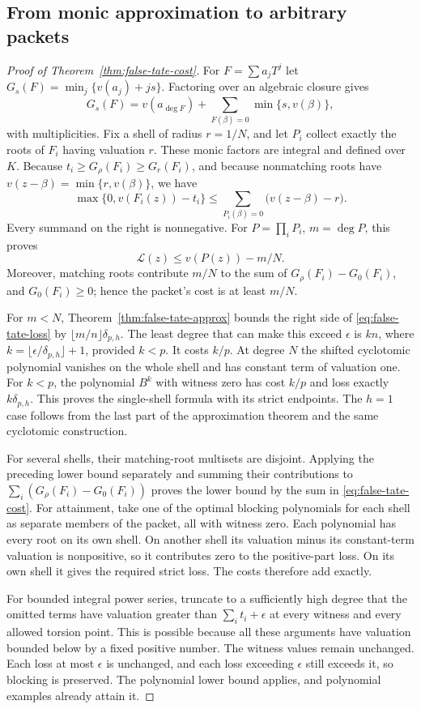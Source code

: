 \subsection{From monic approximation to arbitrary packets}
\begin{proof}[Proof of Theorem~\ref{thm:false-tate-cost}]
For $F=\sum a_jT^j$ let
$G_s(F)=\min_j\{v(a_j)+js\}$. Factoring over an algebraic closure gives
\[
 G_s(F)=v(a_{\deg F})+\sum_{F(\beta)=0}\min\{s,v(\beta)\},
\]
with multiplicities. Fix a shell of radius $r=1/N$, and let $P_i$
collect exactly the roots of $F_i$ having valuation $r$.
These monic factors are integral and defined over $K$.
Because $t_i\ge G_\rho(F_i)\ge G_r(F_i)$, and because nonmatching roots
have $v(z-\beta)=\min\{r,v(\beta)\}$, we have
\[
 \max\{0,v(F_i(z))-t_i\}
 \le\sum_{P_i(\beta)=0}\bigl(v(z-\beta)-r\bigr).
\]
Every summand on the right is nonnegative. For $P=\prod_iP_i$,
$m=\deg P$, this proves
\begin{equation}\label{eq:false-tate-loss}
 \mathcal L(z)\le v(P(z))-m/N.
\end{equation}
Moreover, matching roots contribute $m/N$ to the sum of
$G_\rho(F_i)-G_0(F_i)$, and $G_0(F_i)\ge0$; hence the packet's cost
is at least $m/N$.

For $m<N$, Theorem~\ref{thm:false-tate-approx} bounds the right side
of \eqref{eq:false-tate-loss} by $\lfloor m/n\rfloor\delta_{p,h}$.
The least degree that can make this exceed $\epsilon$ is $kn$, where
$k=\lfloor\epsilon/\delta_{p,h}\rfloor+1$, provided $k<p$.
It costs $k/p$. At degree $N$ the shifted cyclotomic polynomial
vanishes on the whole shell and has constant term of valuation one.
For $k<p$, the polynomial $B^k$ with witness zero has cost $k/p$
and loss exactly $k\delta_{p,h}$. This proves the single-shell formula
with its strict endpoints. The $h=1$ case follows from the last part
of the approximation theorem and the same cyclotomic construction.

For several shells, their matching-root multisets are disjoint.
Applying the preceding lower bound separately and summing their
contributions to $\sum_i(G_\rho(F_i)-G_0(F_i))$ proves the lower
bound by the sum in \eqref{eq:false-tate-cost}.
For attainment, take one of the optimal blocking polynomials for each
shell as separate members of the packet, all with witness zero.
Each polynomial has every root on its own shell. On another shell its
valuation minus its constant-term valuation is nonpositive, so it
contributes zero to the positive-part loss. On its own shell it gives
the required strict loss. The costs therefore add exactly.

For bounded integral power series, truncate to a sufficiently high degree
that the omitted terms have valuation greater than
$\sum_i t_i+\epsilon$ at every witness and every allowed torsion point.
This is possible because all these arguments have valuation bounded
below by a fixed positive number. The witness values remain unchanged.
Each loss at most $\epsilon$ is unchanged, and each loss exceeding
$\epsilon$ still exceeds it, so blocking is preserved. The polynomial
lower bound applies, and polynomial examples already attain it.
\end{proof}

